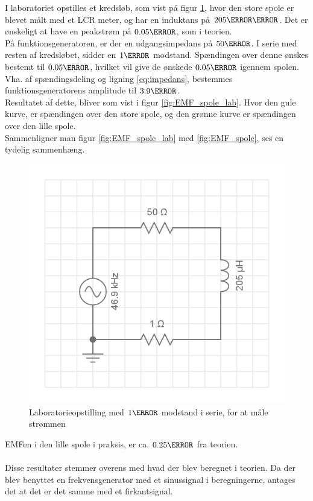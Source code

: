 I laboratoriet opstilles et kredsløb, som vist på figur \ref{fig:kredslob_spole}, hvor den store spole er blevet målt med et LCR meter, og har en induktans på $205\micro\henry$.
Det er ønskeligt at have en peakstrøm på $0.05 \ampere$, som i teorien.\\
På funktionsgeneratoren, er der en udgangsimpedans på $50\ohm$.
I serie med resten af kredsløbet, sidder en $1\ohm$ modstand. Spændingen over denne ønskes bestemt til $0.05\volt$, hvilket vil give de ønskede $0.05\ampere$ igennem spolen.
Vha. af spændingsdeling og ligning \ref{eq:impedans}, bestemmes funktionsgeneratorens amplitude til $3.9\volt$.\\
Resultatet af dette, bliver som vist i figur \ref{fig:EMF_spole_lab}.
Hvor den gule kurve, er spændingen over den store spole, og den grønne kurve er spændingen over den lille spole.\\
Sammenligner man figur \ref{fig:EMF_spole_lab} med \ref{fig:EMF_spole}, ses en tydelig sammenhæng.\\
\begin{figure}
	\centering
	\includegraphics[width=.5\textwidth]{billeder/circuit_spole.png}
	\caption{Laboratorieopstilling med $1\ohm$ modstand i serie, for at måle strømmen}
	\label{fig:kredslob_spole}
\end{figure}
EMFen i den lille spole i praksis, er ca. $0.25\volt$ fra teorien.\\ \\
Disse resultater stemmer overens med hvad der blev beregnet i teorien. Da der blev benyttet en frekvensgenerator med et sinussignal i beregningerne, antages det at det er det samme med et firkantsignal. \\


